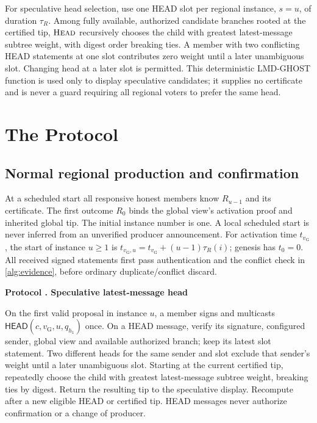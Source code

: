 \documentclass[11pt,a4paper,onecolumn]{article}
\newcommand{\gv}{v_{\mathrm G}}
\newcommand{\Tag}[1]{\mathsf{#1}}
\newcommand{\Proc}[1]{\textnormal{\textsc{#1}}}
\theoremstyle{remark}\newtheorem{example}[definition]{Example}
\newcounter{protocol}
\newenvironment{protocol}[2]{\refstepcounter{protocol}\label{#1}\begin{mdframed}[nobreak=true,linewidth=.6pt,skipabove=10pt,skipbelow=10pt,innertopmargin=8pt,innerbottommargin=8pt]\small\raggedright\noindent\textbf{Protocol \theprotocol. #2}\par\smallskip}{\end{mdframed}}
\begin{document}
For speculative head selection, use one HEAD slot per regional instance,
$s=u$, of duration $\tau_R$. Among fully available,
authorized candidate branches rooted at the certified tip, $\Proc{Head}$
recursively chooses the child with greatest latest-message subtree weight,
with digest order breaking ties. A member with two conflicting HEAD statements
at one slot contributes zero weight until a later unambiguous slot. Changing
head at a later slot is permitted. This deterministic LMD-GHOST function is
used only to display speculative candidates; it supplies no certificate
and is never a guard requiring all regional voters to prefer the same head.

\section{The Protocol}\label{sec:protocol}
\subsection{Normal regional production and confirmation}\label{sec:regional}
At a scheduled start all responsive honest members know $R_{u-1}$ and its
certificate. The first outcome $R_0$ binds the global view's activation proof
and inherited global tip. The initial instance number is one. A local scheduled
start is never inferred from an unverified producer announcement.
For activation time $t_{\gv}$, the start of instance $u\geq1$ is
$t_{\gv,u}=t_{\gv}+(u-1)\tau_R(i)$; genesis has $t_0=0$.
All received signed statements first pass authentication and the conflict
check in \cref{alg:evidence}, before ordinary duplicate/conflict discard.

\begin{protocol}{alg:head}{Speculative latest-message head}
On the first valid proposal in instance $u$, a member signs and multicasts
$\Tag{HEAD}(c,\gv,u,q_{h_1})$ once. On a HEAD message, verify its signature,
configured sender, global view and available authorized branch; keep its
latest slot statement. Two different heads for the same sender and slot
exclude that sender's weight until a later unambiguous slot. Starting at the
current certified tip, repeatedly choose the child with greatest latest-message
subtree weight, breaking ties by digest. Return the resulting tip to the
speculative display. Recompute after a new eligible HEAD or certified tip.
HEAD messages never authorize confirmation or a change of producer.
\end{protocol}
\end{document}
